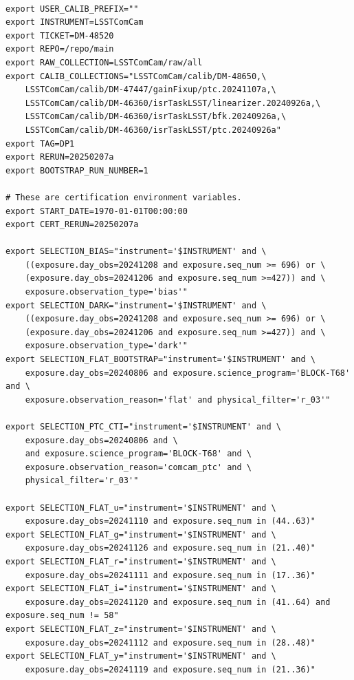 \documentclass[DM,authoryear,toc]{lsstdoc}
\begin{document}
\begin{footnotesize}
\begin{verbatim}

export USER_CALIB_PREFIX=""
export INSTRUMENT=LSSTComCam
export TICKET=DM-48520
export REPO=/repo/main
export RAW_COLLECTION=LSSTComCam/raw/all
export CALIB_COLLECTIONS="LSSTComCam/calib/DM-48650,\
    LSSTComCam/calib/DM-47447/gainFixup/ptc.20241107a,\
    LSSTComCam/calib/DM-46360/isrTaskLSST/linearizer.20240926a,\
    LSSTComCam/calib/DM-46360/isrTaskLSST/bfk.20240926a,\
    LSSTComCam/calib/DM-46360/isrTaskLSST/ptc.20240926a"
export TAG=DP1
export RERUN=20250207a
export BOOTSTRAP_RUN_NUMBER=1

# These are certification environment variables.
export START_DATE=1970-01-01T00:00:00
export CERT_RERUN=20250207a

export SELECTION_BIAS="instrument='$INSTRUMENT' and \
    ((exposure.day_obs=20241208 and exposure.seq_num >= 696) or \
    (exposure.day_obs=20241206 and exposure.seq_num >=427)) and \
    exposure.observation_type='bias'"
export SELECTION_DARK="instrument='$INSTRUMENT' and \
    ((exposure.day_obs=20241208 and exposure.seq_num >= 696) or \
    (exposure.day_obs=20241206 and exposure.seq_num >=427)) and \
    exposure.observation_type='dark'"
export SELECTION_FLAT_BOOTSTRAP="instrument='$INSTRUMENT' and \
    exposure.day_obs=20240806 and exposure.science_program='BLOCK-T68' and \
    exposure.observation_reason='flat' and physical_filter='r_03'"

export SELECTION_PTC_CTI="instrument='$INSTRUMENT' and \
    exposure.day_obs=20240806 and \
    and exposure.science_program='BLOCK-T68' and \
    exposure.observation_reason='comcam_ptc' and \
    physical_filter='r_03'"

export SELECTION_FLAT_u="instrument='$INSTRUMENT' and \
    exposure.day_obs=20241110 and exposure.seq_num in (44..63)"
export SELECTION_FLAT_g="instrument='$INSTRUMENT' and \
    exposure.day_obs=20241126 and exposure.seq_num in (21..40)"
export SELECTION_FLAT_r="instrument='$INSTRUMENT' and \
    exposure.day_obs=20241111 and exposure.seq_num in (17..36)"
export SELECTION_FLAT_i="instrument='$INSTRUMENT' and \
    exposure.day_obs=20241120 and exposure.seq_num in (41..64) and exposure.seq_num != 58"
export SELECTION_FLAT_z="instrument='$INSTRUMENT' and \
    exposure.day_obs=20241112 and exposure.seq_num in (28..48)"
export SELECTION_FLAT_y="instrument='$INSTRUMENT' and \
    exposure.day_obs=20241119 and exposure.seq_num in (21..36)"


\end{verbatim}
\end{footnotesize}
\end{document}
